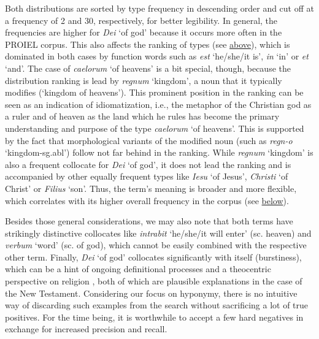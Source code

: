 Both distributions are sorted by type frequency in descending order and cut off at a frequency of 2 and 30, respectively, for better legibility. In general, the frequencies are higher for \textit{Dei} `of god' because it occurs more often in the PROIEL corpus. This also affects the ranking of types (see \hyperref[functionWordsZipfDistribution]{above}), which is dominated in both cases by function words such as \textit{est} `he/she/it is', \textit{in} `in' or \textit{et} `and'. The case of \textit{caelorum} `of heavens' is a bit special, though, because the distribution ranking is lead by \textit{regnum} `kingdom', a noun that it typically modifies (`kingdom of heavens'). This prominent position in the ranking can be seen as an indication of idiomatization, i.e., the metaphor of the Christian god as a ruler and of heaven as the land which he rules has become the primary understanding and purpose of the type \textit{caelorum} `of heavens'. This is supported by the fact that morphological variants of the modified noun (such as \textit{regn-o} `kingdom-{\sc sg.abl}') follow not far behind in the ranking. While \textit{regnum} `kingdom' is also a frequent collocate for \textit{Dei} `of god', it does not lead the ranking and is accompanied by other equally frequent types like \textit{Iesu} `of Jesus', \textit{Christi} `of Christ' or \textit{Filius} `son'. Thus, the term's meaning is broader and more flexible, which correlates with its higher overall frequency in the corpus (see \hyperref[highFrequencyhighPolysemy]{below}).

Besides those general considerations, we may also note that both terms have strikingly distinctive collocates like \textit{intrabit} `he/she/it will enter' (sc. heaven) and \textit{verbum} `word' (sc. of god), which cannot be easily combined with the respective other term. Finally, \textit{Dei} `of god' collocates significantly with itself (burstiness), which can be a hint of ongoing definitional processes \parencite[361]{brookesCorrelationCollocationCohesion2020} and a theocentric perspective on religion \parencite[11]{callisterKeynessCollocationDistinctions2021}, both of which are plausible explanations in the case of the New Testament. Considering our focus on hyponymy, there is no intuitive way of discarding such examples from the search without sacrificing a lot of true positives. For the time being, it is worthwhile to accept a few hard negatives in exchange for increased precision and recall.

